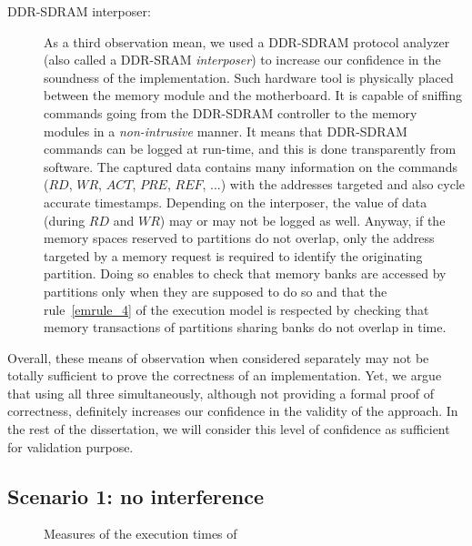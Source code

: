 \documentclass[main.tex]{subfiles}
\begin{document}
\begin{description}
    \item[DDR-SDRAM interposer: ] As a third observation mean, we used a DDR-SDRAM protocol analyzer (also called a DDR-SRAM \emph{interposer}) to increase our confidence in the soundness of the implementation. Such hardware tool is physically placed between the memory module and the motherboard. It is capable of sniffing commands going from the DDR-SDRAM controller to the memory modules in a \emph{non-intrusive} manner. It means that DDR-SDRAM commands can be logged at run-time, and this is done transparently from software. The captured data contains many information on the commands ($RD$, $WR$, $ACT$, $PRE$, $REF$, ...) with the addresses targeted and also cycle accurate timestamps. Depending on the interposer, the value of data (during $RD$ and $WR$) may or may not be logged as well. Anyway, if the memory spaces reserved to partitions do not overlap, only the address targeted by a memory request is required to identify the originating partition. Doing so enables to check that memory banks are accessed by partitions only when they are supposed to do so and that the rule~\ref{emrule_4} of the execution model is respected by checking that memory transactions of partitions sharing banks do not overlap in time.
\end{description}

Overall, these means of observation when considered separately may not be totally sufficient to prove the correctness of an implementation. Yet, we argue that using all three simultaneously, although not providing a formal proof of correctness, definitely increases our confidence in the validity of the approach. In the rest of the dissertation, we will consider this level of confidence as sufficient for validation purpose.

\subsection{Scenario 1: no interference}
\begin{figure}
    \centering
    \scalebox{1}{}	
    \vspace{-5mm}
    \caption{Measures of the execution times of \rosace}
	\label{fig_implemExecModel_ETrosace}
\end{figure}
\end{document}
